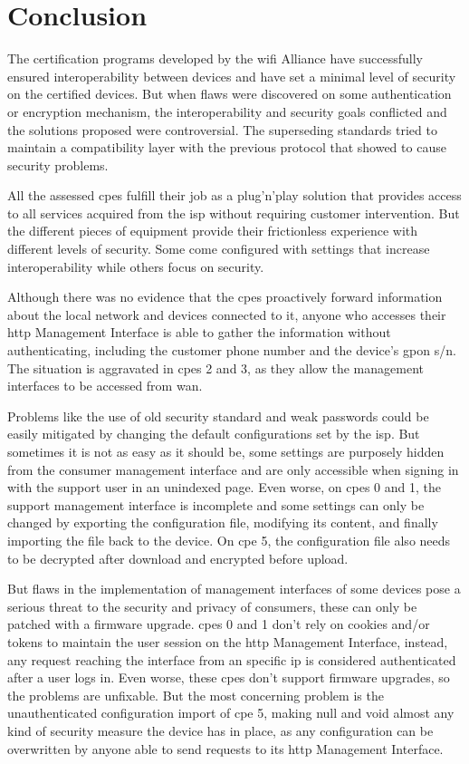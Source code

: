 \section{Conclusion}
\label{section:conclusion}

The certification programs developed by the \gls{wifi} Alliance have successfully ensured interoperability between devices and have set a minimal level of security on the certified devices. But when flaws were discovered on some authentication or encryption mechanism, the interoperability and security goals conflicted and the solutions proposed were controversial. The superseding standards tried to maintain a compatibility layer with the previous protocol that showed to cause security problems.

All the assessed \glspl{cpe} fulfill their job as a plug'n'play solution that provides access to all services acquired from the \gls{isp} without requiring customer intervention. But the different pieces of equipment provide their frictionless experience with different levels of security. Some come configured with settings that increase interoperability while others focus on security.

Although there was no evidence that the \glspl{cpe} proactively forward information about the local network and devices connected to it, anyone who accesses their \gls{http} Management Interface is able to gather the information without authenticating, including the customer phone number and the device's \gls{gpon} \gls{s/n}. The situation is aggravated in \glspl{cpe} 2 and 3, as they allow the management interfaces to be accessed from \gls{wan}.

Problems like the use of old security standard and weak passwords could be easily mitigated by changing the default configurations set by the \gls{isp}. But sometimes it is not as easy as it should be, some settings are purposely hidden from the consumer management interface and are only accessible when signing in with the support user in an unindexed page. Even worse, on \glspl{cpe} 0 and 1, the support management interface is incomplete and some settings can only be changed by exporting the configuration file, modifying its content, and finally importing the file back to the device. On \gls{cpe} 5, the configuration file also needs to be decrypted after download and encrypted before upload.

But flaws in the implementation of management interfaces of some devices pose a serious threat to the security and privacy of consumers, these can only be patched with a firmware upgrade. \glspl{cpe} 0 and 1 don’t rely on cookies and/or tokens to maintain the user session on the \gls{http} Management Interface, instead, any request reaching the interface from an specific \gls{ip} is considered authenticated after a user logs in. Even worse, these \glspl{cpe} don't support firmware upgrades, so the problems are unfixable. But the most concerning problem is the unauthenticated configuration import of \gls{cpe} 5, making null and void almost any kind of security measure the device has in place, as any configuration can be overwritten by anyone able to send requests to its \gls{http} Management Interface.

